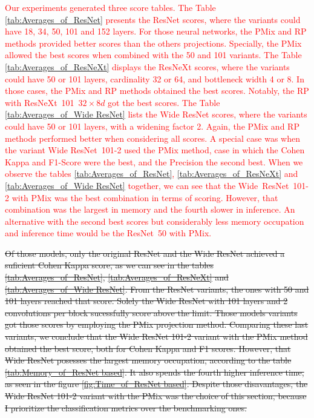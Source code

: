 \textcolor{red}{
Our experiments generated three score tables. 
The Table \ref{tab:Averages_of_ResNet} presents the ResNet scores, where the variants could have 18, 34, 50, 101 and 152 layers. For those neural networks, the \gls{PMix} and \gls{RP} methods provided better scores than the others projections. Specially, the \gls{PMix} allowed the best scores when combined with the 50 and 101 variants.
The Table \ref{tab:Averages_of_ResNeXt} displays the ResNeXt scores, where the variants could have 50 or 101 layers, cardinality 32 or 64, and bottleneck width 4 or 8. In those cases, the \gls{PMix} and \gls{RP} methods obtained the best scores. Notably, the \gls{RP} with \mbox{ResNeXt 101 $32\times 8d$} got the best scores. 
The Table \ref{tab:Averages_of_Wide ResNet} lists the Wide ResNet scores, where the variants could have 50 or 101 layers, with a widening factor 2. Again, the \gls{PMix} and \gls{RP} methods performed better when considering all scores. A special case was when the variant Wide \mbox{ResNet 101-2} used the \gls{PMix} method, case in which the Cohen Kappa and F1-Score were the best, and the Precision the second best.    
When we observe the tables \ref{tab:Averages_of_ResNet}, \ref{tab:Averages_of_ResNeXt} and \ref{tab:Averages_of_Wide ResNet} together, we can see that the \mbox{Wide ResNet 101-2} with \gls{PMix} was the best combination in terms of scoring. However, that combination was the largest in memory and the fourth slower in inference. An alternative with the second best scores but considerably less memory occupation and inference time would be the \mbox{ResNet 50} with \gls{PMix}. 
}

\sout{
Of those models, only the original ResNet and the Wide ResNet achieved a suficient Cohen Kappa score, as we can see in the tables \ref{tab:Averages_of_ResNet}, \ref{tab:Averages_of_ResNeXt} and \ref{tab:Averages_of_Wide ResNet}. From the ResNet variants, the ones with 50 and 101 layers reached that score. Solely the Wide ResNet with 101 layers and 2 convolutions per block sucessfully score above the limit. Those models variants got those scores by employing the \gls{PMix} projection method. Comparing these last variants, we conclude that the Wide ResNet 101-2 variant with the \gls{PMix} method obtained the best score, both for Cohen Kappa and F1 scores. However, that Wide ResNet posesses the largest memory occupation, according to the table \ref{tab:Memory_of_ResNet based}. It also spends the fourth higher inference time, as seen in the figure \ref{fig:Time_of_ResNet based}. Despite those disavantages, the Wide ResNet 101-2 variant with the \gls{PMix} was the choice of this section, because I prioritize the classification metrics over the benchmarking ones.
}

